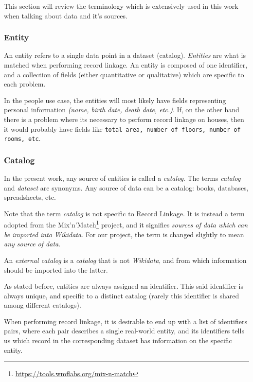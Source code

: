 \documentclass[epsfig,a4paper,11pt,titlepage,twoside,openany]{book}
\newcommand{\footurl}[1]{\footnote{\url{#1}}}
\begin{document}
This section will review the terminology which is extensively used in this work when talking about data and it's sources.

\subsubsection{Entity}
\label{sec:rl-term-entity}

An entity refers to a single data point in a dataset (catalog). \textit{Entities} are what is matched when performing record linkage. An entity is composed of one identifier, and a collection of fields (either quantitative or qualitative) which are specific to each problem. 
  
In the people use case, the entities will most likely have fields representing personal information \textit{(name, birth date, death date, etc.)}. If, on the other hand there is a problem where its necessary to perform record linkage on houses, then it would probably have fields like \texttt{total area, number of floors, number of rooms, etc}.


\subsubsection{Catalog}
\label{sec:rl-term-catalog}

In the present work, any source of entities is called a \textit{catalog}. The terms \textit{catalog} and  \textit{dataset} are synonyms. Any source of data can be a catalog: books, databases, spreadsheets, etc. 

Note that the term \textit{catalog} is not specific to Record Linkage. It is instead a term adopted from the Mix'n'Match\footurl{https://tools.wmflabs.org/mix-n-match} project, and it signifies \textit{sources of data which can be imported into Wikidata}. For our project, the term is changed slightly to mean \textit{any source of data}. 

An \textit{external catalog} is a \textit{catalog} that is not \textit{Wikidata}, and from which information should be imported into the latter.

As stated before, entities are always assigned an identifier. This said identifier is always unique, and specific to a distinct catalog (rarely this identifier is shared among different catalogs). 

When performing record linkage, it is desirable to end up with a list of identifiers pairs, where each pair describes a single real-world entity, and its identifiers tells us which record in the corresponding dataset has information on the specific entity.
\end{document}

